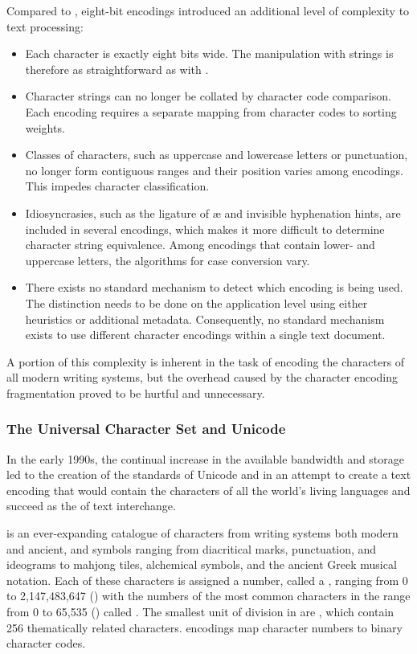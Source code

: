 \documentclass[
  a5paper,10pt,           %
  dvipsnames              %
]{book}
\begin{document}
Compared to , eight-bit encodings introduced an additional level
of complexity to text processing:
\begin{itemize}
  \item Each character is exactly eight bits wide. The manipulation with strings
    is therefore as straightforward as with .
  \item Character strings can no longer be collated by character code
    comparison. Each encoding requires a separate mapping from character codes
    to sorting weights.
  \item Classes of characters, such as uppercase and lowercase letters or
    punctuation, no longer form contiguous ranges and their position varies
    among encodings. This impedes character classification.
  \item Idiosyncrasies, such as the ligature of æ and invisible hyphenation
    hints, are included in several encodings, which makes it more difficult to
    determine character string equivalence. Among encodings that contain lower-
    and uppercase letters, the algorithms for case conversion vary.
  \item There exists no standard mechanism to detect which encoding is being
    used. The distinction needs to be done on the application level using either
    heuristics or additional metadata. Consequently, no standard mechanism
    exists to use different character encodings within a single text document.
\end{itemize}
A portion of this complexity is inherent in the task of encoding the characters
of all modern writing systems, but the overhead caused by the character encoding
fragmentation proved to be hurtful and unnecessary.

\subsubsection{The Universal Character Set and Unicode}
In the early 1990s, the continual increase in the available bandwidth and
storage led to the creation of the standards of Unicode
\cite{unicode91,unicode92} and  in an attempt to create a text
encoding that would contain the characters of all the world's living languages
and succeed  as the  of text
interchange.

 is an ever-expanding catalogue of characters from writing systems
both modern and ancient, and symbols ranging from diacritical marks,
punctuation, and ideograms to mahjong tiles, alchemical symbols, and the ancient
Greek musical notation. Each of these characters is assigned a number, called
a , ranging from 0 to 2,147,483,647 () with the
numbers of the most common characters in the range from 0 to 65,535
() called . The smallest unit of division in
 are , which contain 256
thematically related characters.  encodings map character numbers
to binary character codes.
\end{document}

